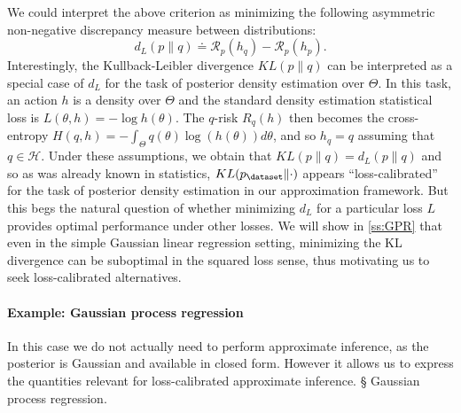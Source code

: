 We could interpret the above criterion as minimizing the following asymmetric non-negative discrepancy measure between distributions:
\begin{equation} \label{e:d_L}
    d_L(p\|q) \doteq \mathcal{R}_{p}(h_q) - \mathcal{R}_{p}(h_p).
\end{equation}
Interestingly, the Kullback-Leibler divergence $KL(p\|q)$ can be interpreted as a special case of $d_L$ for the task of posterior density estimation over $\Theta$. In this task, an action $h$ is a density over $\Theta$ and the standard density estimation statistical loss is $L(\theta,h) = -\log h(\theta)$. The $q$-risk $R_q(h)$ then becomes the cross-entropy $H(q,h)=-\int_\Theta q(\theta) \log(h(\theta)) d\theta$, and so $h_q = q$ assuming that $q \in \mathcal{H}$. Under these assumptions, we obtain that $KL(p\|q) = d_L(p\|q)$ and so as was already known in statistics, $KL(p_\dataset\|\cdot)$ appears ``loss-calibrated'' for the task of posterior density estimation in our approximation framework. But this begs the natural question of whether minimizing $d_L$ for a particular loss $L$ provides optimal performance under other losses. We will show in \ref{ss:GPR} that even in the simple Gaussian linear regression setting, minimizing the KL divergence can be suboptimal in the squared loss sense, thus motivating us to seek loss-calibrated alternatives.

\paragraph{Example: Gaussian process regression}

In this case we do not actually need to perform approximate inference, as the posterior is Gaussian and available in closed form. However it allows us to express the quantities relevant for loss-calibrated approximate inference.
§
Gaussian process regression.